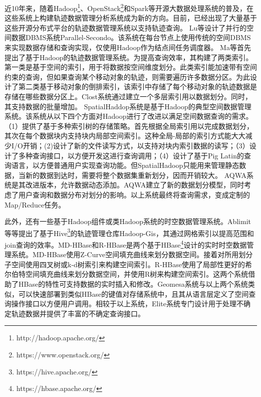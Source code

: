近10年来，随着Hadoop\footnote{http://hadoop.apache.org/}、OpenStack\footnote{https://www.openstack.org/}和Spark等开源大数据处理系统的普及，在这些系统上构建轨迹数据管理分析系统成为新的方向。目前，已经出现了大量基于这些开源分布式平台的轨迹数据管理系统以支持轨迹查询。
Lu等设计了并行的空间数据DBMS系统Parallel-Secondo\cite{LuG12}。该系统在每台节点上使用传统的空间DBMS来实现数据存储和查询实现，仅使用Hadoop作为结点间任务调度器。
Ma等首先提出了基于Hadoop的轨迹数据管理系统\cite{MaYQZ09,YangMQZ09}。为提高查询效率，其构建了两类索引。第一类是基于空间的索引，用于将数据按空间维度划分。此类索引能加速带有空间约束的查询，但如果查询某个移动对象的轨迹，则需要遍历许多数据分区。为此设计了第二类基于移动对象的倒排索引，该索引中存储了每个移动对象的轨迹数据是存储在哪些数据分区上。Clost\cite{TanLN12}系统通过建立一个多层索引用以数据划分。同时，其支持数据的批量增加。
SpatialHaddop\cite{SpatialHadoop}系统是基于Hadoop的典型空间数据管理系统。该系统从以下四个方面对Hadoop进行了改进以满足空间数据查询的需求。
（1）提供了基于多种索引树的存储策略。首先根据全局索引用以完成数据划分，其次在每个数据块内支持块内局部空间索引。这种全局-局部的索引方式能大大减少I/O开销；(2)设计了新的文件读写方式，以支持对块内索引数据的读写；（3）设计了多种查询接口，以方便开发这进行查询调用；（4）设计了基于Pig Latin的查询语言，以方便普通用户实现查询功能。但SpatialHadoop只能用来管理静态数据，当新的数据到达时，需要将整个数据集重新划分，因而开销较大。
AQWA\cite{AlyMHAOEQ15}系统是其改进版本，允许数据动态添加。AQWA建立了新的数据划分模型，同时考虑了用户查询和数据分布对划分的影响。以上系统最终将查询需求，变成定制的Map/Reduce\cite{DeanG04,mapreduce}任务。


此外，还有一些基于Hadoop组件或类Hadoop系统的时空数据管理系统。Ablimit等等提出了基于Hive\footnote{https://hive.apache.org/}的轨迹管理仓库Hadoop-Gis\cite{AjiWVLL0S13}，其通过网格索引以提高范围和join查询的效率。MD-HBase\cite{MDHBase}和R-HBase\cite{RHBase}是两个基于HBase\footnote{https://hbase.apache.org/}设计的实时时空数据管理系统。MD-HBase使用Z-Curve空间填充曲线来划分数据空间。接着对所用划分子空间使用四叉树或k-d树索引来构建空间索引。R-HBase使用了局部性更好的希尔伯特空间填充曲线来划分数据空间，并使用R树来构建空间索引。这两个系统借助了HBase的特性可支持数据的实时插入和修改。Geomesa系统\cite{Geomesa}与以上两个系统类似，可以快速部署到类似HBase的键值对存储系统中，且其从语言层定义了空间查询操作接口以方便用户调用。相较于以上系统，Elite系统\cite{XieMCDJ16}专门设计用于处理不确定轨迹数据并提供了丰富的不确定查询接口。

